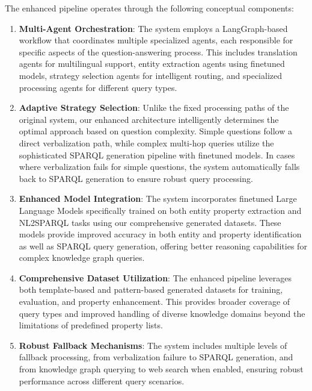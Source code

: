 The enhanced pipeline operates through the following conceptual components:

\begin{enumerate}
    \item \textbf{Multi-Agent Orchestration}: The system employs a LangGraph-based workflow that coordinates multiple specialized agents, each responsible for specific aspects of the question-answering process. This includes translation agents for multilingual support, entity extraction agents using finetuned models, strategy selection agents for intelligent routing, and specialized processing agents for different query types.
    
    \item \textbf{Adaptive Strategy Selection}: Unlike the fixed processing paths of the original system, our enhanced architecture intelligently determines the optimal approach based on question complexity. Simple questions follow a direct verbalization path, while complex multi-hop queries utilize the sophisticated SPARQL generation pipeline with finetuned models. In cases where verbalization fails for simple questions, the system automatically falls back to SPARQL generation to ensure robust query processing.
    
    \item \textbf{Enhanced Model Integration}: The system incorporates finetuned Large Language Models specifically trained on both entity property extraction and NL2SPARQL tasks using our comprehensive generated datasets. These models provide improved accuracy in both entity and property identification as well as SPARQL query generation, offering better reasoning capabilities for complex knowledge graph queries.
    
    \item \textbf{Comprehensive Dataset Utilization}: The enhanced pipeline leverages both template-based and pattern-based generated datasets for training, evaluation, and property enhancement. This provides broader coverage of query types and improved handling of diverse knowledge domains beyond the limitations of predefined property lists.
    
    \item \textbf{Robust Fallback Mechanisms}: The system includes multiple levels of fallback processing, from verbalization failure to SPARQL generation, and from knowledge graph querying to web search when enabled, ensuring robust performance across different query scenarios.
\end{enumerate}

